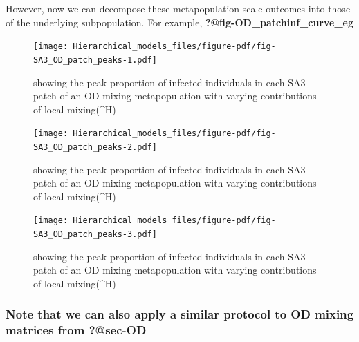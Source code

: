 \documentclass[
  letterpaper,
  DIV=11,
  numbers=noendperiod]{scrartcl}
\begin{document}
However, now we can decompose these metapopulation scale outcomes into
those of the underlying subpopulation. For example,
\textbf{?@fig-OD\_patchinf\_curve\_eg}

\begin{figure}

{\centering \texttt{[image: Hierarchical\_models\_files/figure-pdf/fig-SA3\_OD\_patch\_peaks-1.pdf]}

}

\caption{\label{fig-SA3_OD_patch_peaks-1}showing the peak proportion of
infected individuals in each SA3 patch of an OD mixing metapopulation
with varying contributions of local mixing(\delta\^{}H)}

\end{figure}

\begin{figure}

{\centering \texttt{[image: Hierarchical\_models\_files/figure-pdf/fig-SA3\_OD\_patch\_peaks-2.pdf]}

}

\caption{\label{fig-SA3_OD_patch_peaks-2}showing the peak proportion of
infected individuals in each SA3 patch of an OD mixing metapopulation
with varying contributions of local mixing(\delta\^{}H)}

\end{figure}

\begin{figure}

{\centering \texttt{[image: Hierarchical\_models\_files/figure-pdf/fig-SA3\_OD\_patch\_peaks-3.pdf]}

}

\caption{\label{fig-SA3_OD_patch_peaks-3}showing the peak proportion of
infected individuals in each SA3 patch of an OD mixing metapopulation
with varying contributions of local mixing(\delta\^{}H)}

\end{figure}

\hypertarget{note-that-we-can-also-apply-a-similar-protocol-to-od-mixing-matrices-from-sec-od_}{%
\subsubsection{\texorpdfstring{Note that we can also apply a similar
protocol to OD mixing matrices from
\textbf{?@sec-OD\_}}{Note that we can also apply a similar protocol to OD mixing matrices from ?@sec-OD\_}}\label{note-that-we-can-also-apply-a-similar-protocol-to-od-mixing-matrices-from-sec-od_}}
\end{document}
